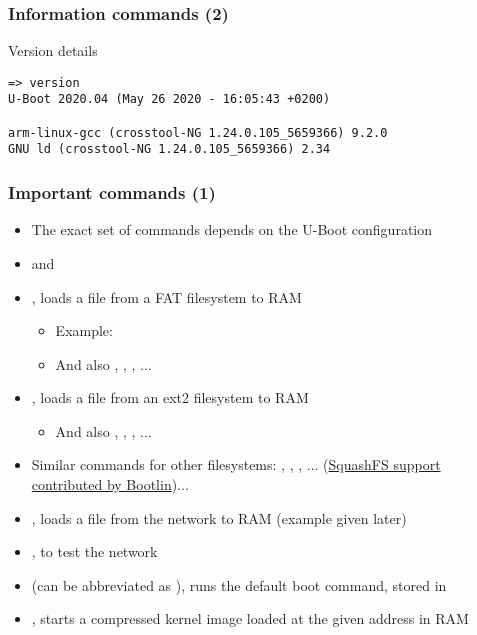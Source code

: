 \begin{frame}[fragile]
  \frametitle{Information commands (2)}
\begin{block}{Version details}
{\small
\begin{verbatim}
=> version
U-Boot 2020.04 (May 26 2020 - 16:05:43 +0200)

arm-linux-gcc (crosstool-NG 1.24.0.105_5659366) 9.2.0
GNU ld (crosstool-NG 1.24.0.105_5659366) 2.34
\end{verbatim}}
\end{block}
\end{frame}

\begin{frame}
  \frametitle{Important commands (1)}
  \begin{itemize}
  \item The exact set of commands depends on the U-Boot configuration
  \item {} and 
  \item {}, loads a file from a FAT filesystem to RAM
    \begin{itemize}
    \item Example: 
    \item And also , , ,
          ...
    \end{itemize}
  \item {}, loads a file from an ext2 filesystem to RAM
    \begin{itemize}
    \item And also , , ,
          ...
    \end{itemize}
  \item Similar commands for other filesystems: ,
      , , ...
      (\href{https://bootlin.com/blog/bootlin-contributes-squashfs-support-to-u-boot/}{SquashFS
      support contributed by Bootlin})...
  \item {}, loads a file from the network to RAM (example given later)
  \item {}, to test the network
  \item {} (can be abbreviated as ), runs the default
    boot command, stored in 
  \item {}, starts a compressed kernel image loaded at the
    given address in RAM
  \end{itemize}
\end{frame}

